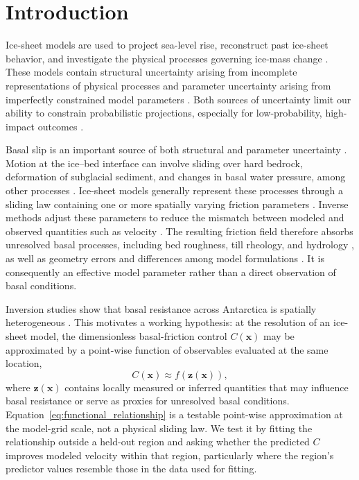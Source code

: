 \documentclass[review,jog]{igs}
\begin{document}
\section{Introduction}

Ice-sheet models are used to project sea-level rise, reconstruct past ice-sheet behavior, and investigate the physical processes governing ice-mass change \citep[e.g.][]{lecavalier2025history,nowicki2016ice}. These models contain structural uncertainty arising from incomplete representations of physical processes and parameter uncertainty arising from imperfectly constrained model parameters \citep{hebeler2008impact,recinos2023framework}. Both sources of uncertainty limit our ability to constrain probabilistic projections, especially for low-probability, high-impact outcomes \citep{kopp2017evolving}.

Basal slip is an important source of both structural and parameter uncertainty \citep{joughin2019regularized, bulthuis2019uncertainty}. Motion at the ice--bed interface can involve sliding over hard bedrock, deformation of subglacial sediment, and changes in basal water pressure, among other processes \citep{schoof2013ice,cuffey2010physics}. Ice-sheet models generally represent these processes through a sliding law containing one or more spatially varying friction parameters \citep{weertman1964theory,schoof2005cavitation}. Inverse methods adjust these parameters to reduce the mismatch between modeled and observed quantities such as velocity \citep{macayeal1993tutorial}. The resulting friction field therefore absorbs unresolved basal processes, including bed roughness, till rheology, and hydrology \citep{hoffman2022impact,tulaczyk2000basal,lu2023coupling}, as well as geometry errors and differences among model formulations \citep{zhao2018basal,barnes2021transferability}. It is consequently an effective model parameter rather than a direct observation of basal conditions.

Inversion studies show that basal resistance across Antarctica is spatially heterogeneous \citep{morlighem2013inversion,zhao2018basal}. This motivates a working hypothesis: at the resolution of an ice-sheet model, the dimensionless basal-friction control $C(\mathbf{x})$ may be approximated by a point-wise function of observables evaluated at the same location,
\begin{equation}
\label{eq:functional_relationship}
C(\mathbf{x}) \approx f\!\left(\mathbf{z}(\mathbf{x})\right),
\end{equation}
where $\mathbf{z}(\mathbf{x})$ contains locally measured or inferred quantities that may influence basal resistance or serve as proxies for unresolved basal conditions. Equation~\ref{eq:functional_relationship} is a testable point-wise approximation at the model-grid scale, not a physical sliding law. We test it by fitting the relationship outside a held-out region and asking whether the predicted $C$ improves modeled velocity within that region, particularly where the region's predictor values resemble those in the data used for fitting.
\end{document}
